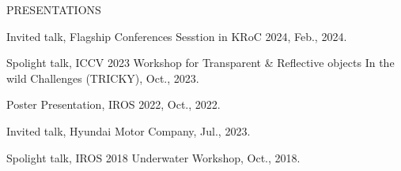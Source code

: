 \begin{rSection}{PRESENTATIONS}{}{}{}        
    \begin{rSubsection}{}{}{}{}    
        \item Invited talk, Flagship Conferences Sesstion in KRoC 2024, Feb., 2024.
        \item Spolight talk, ICCV 2023 Workshop for Transparent \& Reflective objects In the wild Challenges (TRICKY), Oct., 2023.
        \item Poster Presentation, IROS 2022, Oct., 2022.
        \item Invited talk, Hyundai Motor Company, Jul., 2023.
        \item Spolight talk, IROS 2018 Underwater Workshop, Oct., 2018.
     \end{rSubsection}         
 \end{rSection}

